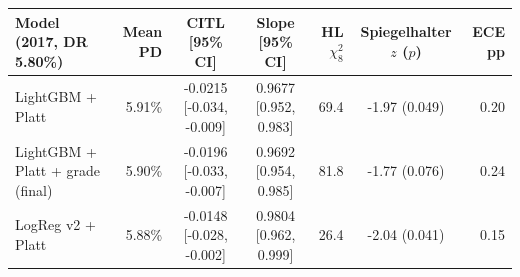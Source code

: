 \begin{tabular}{lrccrcr}
\toprule
Model (2017, DR 5.80\%) & Mean PD & CITL [95\% CI] & Slope [95\% CI] & HL $\chi^2_8$ & Spiegelhalter $z$ ($p$) & ECE pp \\
\midrule
LightGBM + Platt & 5.91\% & -0.0215 [-0.034, -0.009] & 0.9677 [0.952, 0.983] & 69.4 & -1.97 (0.049) & 0.20 \\
LightGBM + Platt + grade (final) & 5.90\% & -0.0196 [-0.033, -0.007] & 0.9692 [0.954, 0.985] & 81.8 & -1.77 (0.076) & 0.24 \\
LogReg v2 + Platt & 5.88\% & -0.0148 [-0.028, -0.002] & 0.9804 [0.962, 0.999] & 26.4 & -2.04 (0.041) & 0.15 \\
\bottomrule
\end{tabular}
